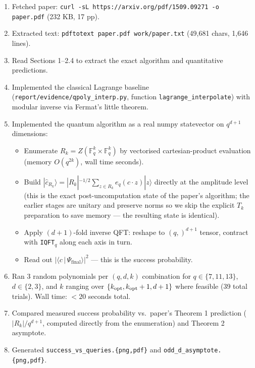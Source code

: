 \documentclass[11pt]{article}
\begin{document}
\begin{enumerate}
    \item Fetched paper: \verb|curl -sL https://arxiv.org/pdf/1509.09271 -o paper.pdf| (232 KB, 17 pp).
    \item Extracted text: \verb|pdftotext paper.pdf work/paper.txt| (49{,}681 chars, 1{,}646 lines).
    \item Read Sections 1–2.4 to extract the exact algorithm and quantitative predictions.
    \item Implemented the classical Lagrange baseline (\verb|report/evidence/qpoly_interp.py|,
    function \texttt{lagrange\_interpolate}) with modular inverse via Fermat's little theorem.
    \item Implemented the quantum algorithm as a real numpy statevector on $q^{d+1}$ dimensions:
    \begin{itemize}
        \item Enumerate $R_k = Z(\mathbb{F}_q^k \times \mathbb{F}_q^k)$ by vectorised
        cartesian-product evaluation (memory $O(q^{2k})$, wall time seconds).
        \item Build $|\hat c_{R_k}\rangle = |R_k|^{-1/2} \sum_{z \in R_k} e_q(c \cdot z)|z\rangle$
        directly at the amplitude level (this is the exact post-uncomputation state
        of the paper's algorithm; the earlier stages are unitary and preserve norms so we
        skip the explicit $T_k$ preparation to save memory --- the resulting state is identical).
        \item Apply $(d+1)$-fold inverse QFT: reshape to $(q,)^{d+1}$ tensor, contract with
        \texttt{IQFT}$_q$ along each axis in turn.
        \item Read out $|\langle c\,|\,\Psi_{\text{final}}\rangle|^2$ --- this is the success probability.
    \end{itemize}
    \item Ran 3 random polynomials per $(q, d, k)$ combination for $q \in \{7,11,13\}$,
    $d \in \{2, 3\}$, and $k$ ranging over $\{k_{\rm opt}, k_{\rm opt}+1, d+1\}$ where feasible
    (39 total trials).  Wall time: $< 20$ seconds total.
    \item Compared measured success probability vs.\ paper's Theorem 1 prediction
    ($|R_k|/q^{d+1}$, computed directly from the enumeration) and Theorem 2 asymptote.
    \item Generated \verb|success_vs_queries.{png,pdf}| and \verb|odd_d_asymptote.{png,pdf}|.
\end{enumerate}
\end{document}
